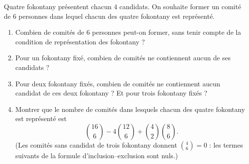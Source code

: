 Quatre fokontany présentent chacun $4$ candidats. On souhaite former un
comité de $6$ personnes dans lequel chacun des quatre fokontany est
représenté.
\begin{enumerate}
  \item Combien de comités de $6$ personnes peut-on former, sans tenir compte de
  la condition de représentation des fokontany ?
  \item Pour un fokontany fixé, combien de comités ne contiennent aucun de ses
  candidats ?
  \item Pour deux fokontany fixés, combien de comités ne contiennent aucun
  candidat de ces deux fokontany ? Et pour trois fokontany fixés ?
  \item Montrer que le nombre de comités dans lesquels chacun des quatre
  fokontany est représenté est
  \[
  \binom{16}{6} - 4\binom{12}{6} + \binom{4}{2}\binom{8}{6}.
  \]
  (Les comités sans candidat de trois fokontany donnent $\binom{4}{6} = 0$ : les
  termes suivants de la formule d'inclusion--exclusion sont nuls.)
\end{enumerate}
